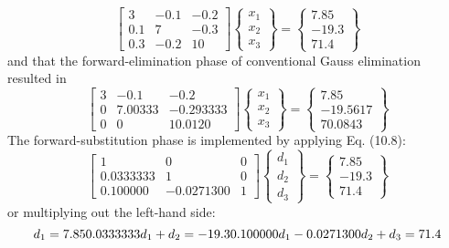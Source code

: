\documentclass[../main.tex]{subfiles}
\begin{document}
\begin{equation}
\begin{bmatrix}
3 & -0.1 & -0.2 \\ 
0.1 & 7 & -0.3 \\ 
0.3 & -0.2 & 10
\end{bmatrix}
\begin{Bmatrix}
x_{1}\\ 
x_{2}\\ 
x_{3}
\end{Bmatrix}
=
\begin{Bmatrix}
7.85\\ 
-19.3\\ 
71.4
\end{Bmatrix}
\end{equation}
and that the forward-elimination phase of conventional Gauss elimination resulted in
\begin{equation}
\begin{bmatrix}
3 & -0.1 & -0.2 \\ 
0 & 7.00333 & -0.293333 \\ 
0 & 0 & 10.0120
\end{bmatrix}
\begin{Bmatrix}
x_{1}\\ 
x_{2}\\ 
x_{3}
\end{Bmatrix}
=
\begin{Bmatrix}
7.85\\ 
-19.5617\\ 
70.0843
\end{Bmatrix}
\end{equation}
The forward-substitution phase is implemented by applying Eq. (10.8):
\begin{equation}
\begin{bmatrix}
1 & 0 & 0 \\ 
0.0333333 & 1& 0 \\ 
0.100000 & -0.0271300 & 1
\end{bmatrix}
\begin{Bmatrix}
d_{1}\\ 
d_{2}\\ 
d_{3}
\end{Bmatrix}
=
\begin{Bmatrix}
7.85\\ 
-19.3\\ 
71.4
\end{Bmatrix}
\end{equation}
or multiplying out the left-hand side:
\begin{equation}
d_{1}=7.85\\
0.0333333d_{1}+d_{2}=-19.3\\
0.100000d_{1}-0.0271300d_{2}+d_{3}=71.4
\end{equation}
\end{document}
